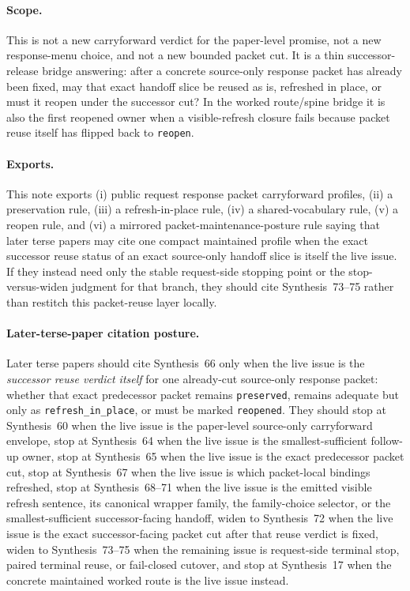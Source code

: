 \documentclass[11pt]{article}
\begin{document}
\paragraph{Scope.}
This is not a new carryforward verdict for the paper-level promise, not a new response-menu choice, and not a new bounded packet cut.
It is a thin successor-release bridge answering: after a concrete source-only response packet has already been fixed, may that exact handoff slice be reused as is, refreshed in place, or must it reopen under the successor cut? In the worked route/spine bridge it is also the first reopened owner when a visible-refresh closure fails because packet reuse itself has flipped back to \texttt{reopen}.

\paragraph{Exports.}
This note exports (i) public request response packet carryforward profiles, (ii) a preservation rule, (iii) a refresh-in-place rule, (iv) a shared-vocabulary rule, (v) a reopen rule, and (vi) a mirrored packet-maintenance-posture rule saying that later terse papers may cite one compact maintained profile when the exact successor reuse status of an exact source-only handoff slice is itself the live issue. If they instead need only the stable request-side stopping point or the stop-versus-widen judgment for that branch, they should cite Synthesis~73--75 rather than restitch this packet-reuse layer locally.

\paragraph{Later-terse-paper citation posture.}
Later terse papers should cite Synthesis~66 only when the live issue is the \emph{successor reuse verdict itself} for one already-cut source-only response packet: whether that exact predecessor packet remains \texttt{preserved}, remains adequate but only as \texttt{refresh\_in\_place}, or must be marked \texttt{reopened}. They should stop at Synthesis~60 when the live issue is the paper-level source-only carryforward envelope, stop at Synthesis~64 when the live issue is the smallest-sufficient follow-up owner, stop at Synthesis~65 when the live issue is the exact predecessor packet cut, stop at Synthesis~67 when the live issue is which packet-local bindings refreshed, stop at Synthesis~68--71 when the live issue is the emitted visible refresh sentence, its canonical wrapper family, the family-choice selector, or the smallest-sufficient successor-facing handoff, widen to Synthesis~72 when the live issue is the exact successor-facing packet cut after that reuse verdict is fixed, widen to Synthesis~73--75 when the remaining issue is request-side terminal stop, paired terminal reuse, or fail-closed cutover, and stop at Synthesis~17 when the concrete maintained worked route is the live issue instead.\cite{series:publicrequestresponsepacketrefreshnotices,series:publicrequestresponsepacketrefreshnoticenormalforms,series:publicrequestresponsepacketrefreshnoticeselections,series:publicrequestresponsepacketrefreshresponsemenus,series:publicrequestresponsepacketrefreshresponsepackets}
\end{document}
